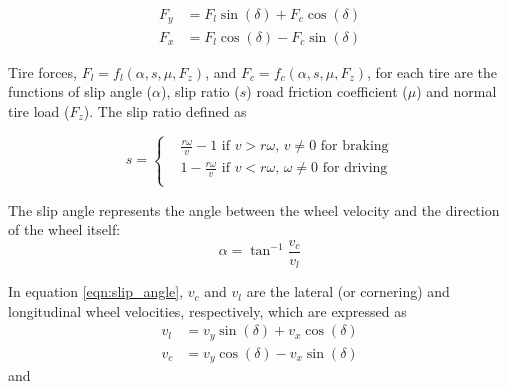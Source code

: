 \documentclass[12pt]{article}
\begin{document}
\begin{subequations} 
	\begin{align} F_y &= F_{l}\sin(\delta) + F_{c}\cos(\delta) \label{eqn:longitudinal_tire_force} \\
	F_x &= F_{l}\cos(\delta) - F_{c}\sin(\delta) 	 \label{eqn:lateral_tire_foce} 
	\end{align} 
\end{subequations}
\par Tire forces, $F_{l} = f_{l}(\alpha, s, \mu, F_z)$, and $F_{c} = f_{c}(\alpha, s, \mu, F_z)$, for each tire are the functions of slip angle ($\alpha$), slip ratio ($s$) road friction coefficient ($\mu$) and normal tire load ($F_{z}$). The slip ratio defined as

\begin{equation}
	\label{eqn:slip_ratio}
	s =
	\begin{cases}
	& \frac{r\omega}{v} - 1 \,\,\text{if}\,\, v > r\omega, \,v \neq 0 \,\, \text{for braking}  \\
	& 1- \frac{r\omega}{v} \,\,\text{if}\,\, v < r\omega, \,\omega \neq 0 \,\, \text{for driving}\\
	\end{cases}   
\end{equation} 
\par The slip angle represents the angle between the wheel velocity and the direction of
the wheel itself:
\begin{equation}
	\label{eqn:slip_angle}
	\alpha = \tan^{-1}\frac{v_{c}}{v_{l}}
\end{equation}
\par In equation \ref{eqn:slip_angle}, $v_{c}$ and $v_{l}$ are the lateral (or cornering) and longitudinal wheel
velocities, respectively, which are expressed as
\begin{subequations} 
	\begin{align} 
	v_l &= v_{y}\sin(\delta) + v_{x}\cos(\delta) \label{eqn:lateral_wheel_velocities} \\
	v_c &= v_{y}\cos(\delta) - v_{x}\sin(\delta) 	 \label{eqn:longitudinal_wheel_velocities}
	\end{align} 
\end{subequations}
and
\end{document}
